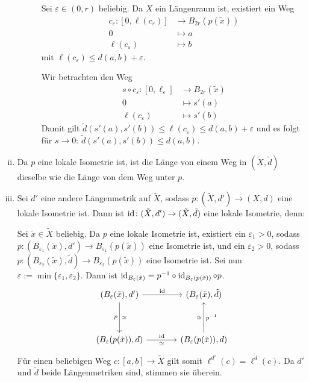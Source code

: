 \begin{beweis}
\begin{enumerate}[(i)]
\begin{description}
			Sei $\varepsilon \in (0,r)$ beliebig.
			Da $X$ ein Längenraum ist, existiert ein Weg
			\begin{align*}
				c_\varepsilon\colon [0,\ell(c_\varepsilon)] &\longrightarrow B_{2r}(p(\tilde{x})) \\
				0 &\longmapsto a \\
				\ell(c_\varepsilon) &\longmapsto b
			\end{align*}
			mit $\ell(c_\varepsilon) \leq d(a,b) + \varepsilon$.

			Wir betrachten den Weg
			\begin{align*}
				s \circ c_\varepsilon\colon [0,\ell_\varepsilon] &\longrightarrow B_{2r}(\tilde{x}) \\
				0 &\longmapsto s'(a) \\
				\ell(c_\varepsilon) &\longmapsto s'(b)
			\end{align*}
			Damit gilt $\tilde{d}(s'(a),s'(b)) \leq \ell(c_\varepsilon) \leq d(a,b) + \varepsilon$ und es folgt für $s \rightarrow 0$: $\tilde{d}(s'(a),s'(b)) \leq d(a,b)$.
		\end{description}
		\item Da $p$ eine lokale Isometrie ist, ist die Länge von einem Weg in $(\tilde{X},\tilde{d})$ dieselbe wie die Länge von dem Weg unter $p$.
		\item Sei $d'$ eine andere Längenmetrik auf $\tilde{X}$, sodass $p \colon (\tilde{X},d') \rightarrow (X,d)$ eine lokale Isometrie ist.
		Dann ist $\operatorname{id}\colon (\tilde{X},d') \rightarrow (\tilde{X},\tilde{d})$ eine lokale Isometrie, denn:
		
		Sei $\tilde{x} \in \tilde{X}$ beliebig.
		Da $p$ eine lokale Isometrie ist, existiert ein $\varepsilon_1 > 0$, sodass $p \colon (B_{\varepsilon_1}(\tilde{x}),d') \rightarrow B_{\varepsilon_1}(p(\tilde{x}))$ eine Isometrie ist, und ein $\varepsilon_2 > 0$, sodass $p \colon (B_{\varepsilon_2}(\tilde{x}),\tilde{d}) \rightarrow B_{\varepsilon_2}(p(\tilde{x}))$ eine Isometrie ist.
		Sei nun $\varepsilon := \min\{\varepsilon_1,\varepsilon_2\}$.
		Dann ist $\operatorname{id}_{B_\varepsilon(\tilde{x})} = p^{-1} \circ \operatorname{id}_{B_\varepsilon(p(\tilde{x}))} \circ p$.
		\[
		\begin{tikzcd}[column sep=large, row sep=huge]
			(B_\varepsilon(\tilde{x}),d') \arrow{r}{\id} \arrow[d,"\simeq","p"'] & (B_\varepsilon(\tilde{x}),\tilde{d}) \\
			(B_\varepsilon(p(\tilde{x})),d) \arrow[r,"\id","\simeq"'] & (B_\varepsilon(p(\tilde{x})),d) \arrow[u,"\simeq","p^{-1}"']
		\end{tikzcd}
		\]
		Für einen beliebigen Weg $c \colon [a,b] \rightarrow \tilde{X}$ gilt somit $\ell^{d'}(c) = \ell^{\tilde{d}}(c)$.
		Da $d'$ und $\tilde{d}$ beide Längenmetriken sind, stimmen sie überein. 
	\end{enumerate}
\end{beweis}

